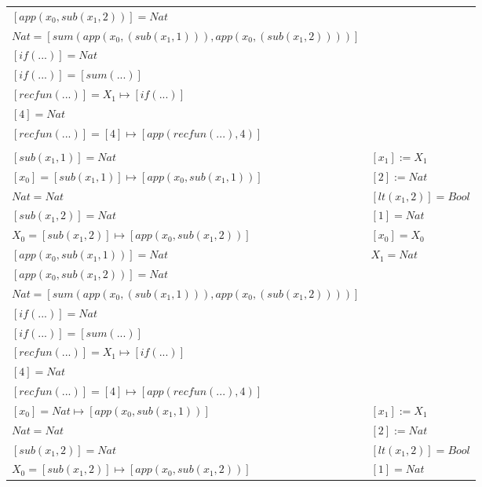 \begin{exercise}
\begin{description}
\begin{center}
\begin{longtable}{ | l | l | }
                        $[app(x_0, sub(x_1,2))] = Nat$ & \\
                        $Nat = [sum(app(x_0, (sub(x_1,1))), app(x_0, (sub(x_1,2))))]$ & \\
                        $[if(...)] = Nat$ & \\
                        $[if(...)] = [sum(...)]$ & \\
                        $[recfun(...)] = X_1 \mapsto [if(...)]$ & \\
                        $[4] = Nat$ & \\
                        $[recfun(...)] = [4] \mapsto [app(recfun(...), 4)]$ & \\
                    \hline &  \\
                        $[sub(x_1,1)] = Nat$ &  $[x_1] := X_1$ \\
                        $[x_0] = [sub(x_1,1)] \mapsto [app(x_0, sub(x_1,1))]$ & $[2] := Nat$ \\
                        $Nat = Nat$ & $[lt(x_1 , 2)] = Bool$ \\
                        $[sub(x_1,2)] = Nat$ & $[1] = Nat$ \\
                        $X_0 = [sub(x_1,2)] \mapsto [app(x_0, sub(x_1,2))]$ & $[x_0] = X_0$  \\
                        $[app(x_0, sub(x_1,1))] = Nat$ & $X_1 = Nat$\\
                        $[app(x_0, sub(x_1,2))] = Nat$ & \\
                        $Nat = [sum(app(x_0, (sub(x_1,1))), app(x_0, (sub(x_1,2))))]$ & \\
                        $[if(...)] = Nat$ & \\
                        $[if(...)] = [sum(...)]$ & \\
                        $[recfun(...)] = X_1 \mapsto [if(...)]$ & \\
                        $[4] = Nat$ & \\
                        $[recfun(...)] = [4] \mapsto [app(recfun(...), 4)]$ & \\
                    \hline
                        $[x_0] = Nat \mapsto [app(x_0, sub(x_1,1))]$ &   $[x_1] := X_1$ \\
                        $Nat = Nat$ & $[2] := Nat$ \\
                        $[sub(x_1,2)] = Nat$ & $[lt(x_1 , 2)] = Bool$ \\
                        $X_0 = [sub(x_1,2)] \mapsto [app(x_0, sub(x_1,2))]$ &  $[1] = Nat$ \\

\end{longtable}
\end{center}
\end{description}
\end{exercise}
